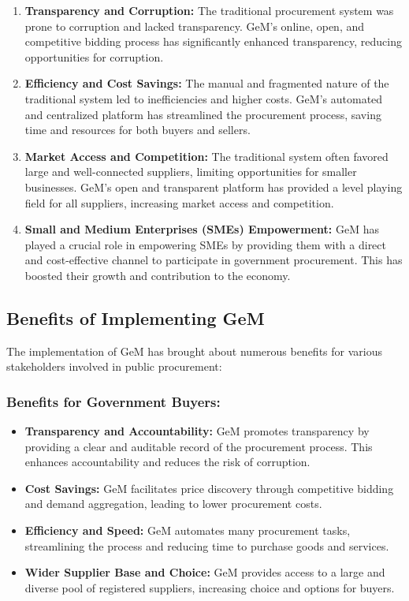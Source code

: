 \begin{enumerate}
    \item \textbf{Transparency and Corruption:} The traditional procurement system was prone to corruption and lacked transparency. GeM's online, open, and competitive bidding process has significantly enhanced transparency, reducing opportunities for corruption.
    
    \item \textbf{Efficiency and Cost Savings:} The manual and fragmented nature of the traditional system led to inefficiencies and higher costs. GeM's automated and centralized platform has streamlined the procurement process, saving time and resources for both buyers and sellers.
    
    \item \textbf{Market Access and Competition:} The traditional system often favored large and well-connected suppliers, limiting opportunities for smaller businesses. GeM's open and transparent platform has provided a level playing field for all suppliers, increasing market access and competition.
    
    \item \textbf{Small and Medium Enterprises (SMEs) Empowerment:} GeM has played a crucial role in empowering SMEs by providing them with a direct and cost-effective channel to participate in government procurement. This has boosted their growth and contribution to the economy.
\end{enumerate}

\subsection{Benefits of Implementing GeM}

The implementation of GeM has brought about numerous benefits for various stakeholders involved in public procurement:

\subsubsection{Benefits for Government Buyers:}

\begin{itemize}
    \item \textbf{Transparency and Accountability:} GeM promotes transparency by providing a clear and auditable record of the procurement process. This enhances accountability and reduces the risk of corruption.
    
    \item \textbf{Cost Savings:} GeM facilitates price discovery through competitive bidding and demand aggregation, leading to lower procurement costs.
    
    \item \textbf{Efficiency and Speed:} GeM automates many procurement tasks, streamlining the process and reducing time to purchase goods and services.
    
    \item \textbf{Wider Supplier Base and Choice:} GeM provides access to a large and diverse pool of registered suppliers, increasing choice and options for buyers.
\end{itemize}

